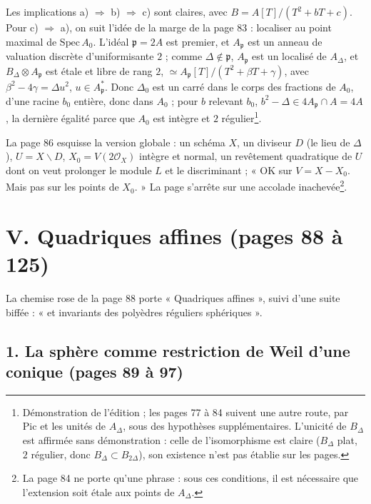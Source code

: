 \documentclass[11pt,a4paper]{article}
\begin{document}
Les implications a) $\Rightarrow$ b) $\Rightarrow$ c) sont claires, avec $B =
A[T]/(T^2 + bT + c)$. Pour c) $\Rightarrow$ a), on suit l'idée de la marge de la page
83 : localiser au point maximal de $\mathrm{Spec}\,A_0$. L'idéal $\mathfrak{p} = 2A$ est
premier, et $A_{\mathfrak{p}}$ est un anneau de valuation discrète d'uniformisante $2$ ;
comme $\Delta \notin \mathfrak{p}$, $A_{\mathfrak{p}}$ est un localisé de $A_\Delta$, et
$B_\Delta \otimes A_{\mathfrak{p}}$ est étale et libre de rang $2$, $\simeq
A_{\mathfrak{p}}[T]/(T^2 + \beta T + \gamma)$, avec $\beta^2 - 4\gamma = \Delta u^2$, $u
\in A_{\mathfrak{p}}^{*}$. Donc $\Delta_0$ est un carré dans le corps des fractions de
$A_0$, d'une racine $b_0$ entière, donc dans $A_0$ ; pour $b$ relevant $b_0$, $b^2 -
\Delta \in 4A_{\mathfrak{p}} \cap A = 4A$, la dernière égalité parce que $A_0$ est intègre
et $2$ régulier\footnote{Démonstration de l'édition ; les pages 77 à 84 suivent une
autre route, par $\mathrm{Pic}$ et les unités de $A_\Delta$, sous des hypothèses
supplémentaires. L'unicité de $B_\Delta$ est affirmée sans démonstration : celle de
l'isomorphisme est claire ($B_\Delta$ plat, $2$ régulier, donc $B_\Delta \subset
B_{2\Delta}$), son existence n'est pas établie sur les pages.}.

La page 86 esquisse la version globale : un schéma $X$, un diviseur $D$ (le lieu de
$\Delta$), $U = X \smallsetminus D$, $X_0 = V(2\mathcal{O}_X)$ intègre et normal, un
revêtement quadratique de $U$ dont on veut prolonger le module $L$ et le discriminant
; « OK sur $V = X - X_0$. Mais pas sur les points de $X_0$. » La page s'arrête sur
une accolade inachevée\footnote{La page 84 ne porte qu'une phrase : sous ces
conditions, il est nécessaire que l'extension soit étale aux points de $A_\Delta$.}.

\section*{V. Quadriques affines (pages 88 à 125)}

La chemise rose de la page 88 porte « Quadriques affines », suivi d'une suite
biffée : « et invariants des polyèdres réguliers sphériques ».

\subsection*{1. La sphère comme restriction de Weil d'une conique (pages 89 à 97)}
\end{document}

